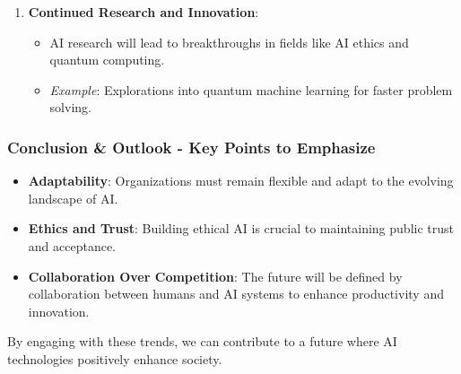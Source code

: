 \documentclass{beamer}
\begin{document}
\begin{frame}[fragile]
\begin{enumerate}
        \item \textbf{Continued Research and Innovation}:
            \begin{itemize}
                \item AI research will lead to breakthroughs in fields like AI ethics and quantum computing.
                \item \textit{Example}: Explorations into quantum machine learning for faster problem solving.
            \end{itemize}
    \end{enumerate}
\end{frame}

\begin{frame}[fragile]
    \frametitle{Conclusion \& Outlook - Key Points to Emphasize}
    
    \begin{itemize}
        \item \textbf{Adaptability}: Organizations must remain flexible and adapt to the evolving landscape of AI.
        
        \item \textbf{Ethics and Trust}: Building ethical AI is crucial to maintaining public trust and acceptance.
        
        \item \textbf{Collaboration Over Competition}: The future will be defined by collaboration between humans and AI systems to enhance productivity and innovation.
    \end{itemize}
    
    By engaging with these trends, we can contribute to a future where AI technologies positively enhance society.
\end{frame}
\end{document}
